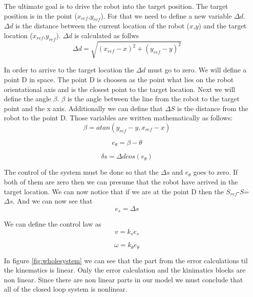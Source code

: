 The ultimate goal is to drive the robot into the target position. The target position is in the point ($x_{ref}$,$y_{ref}$). For that we need to define a new variable $\Delta d$. $\Delta d$ is the distance between the current location of the robot ($x$,$y$) and the target location ($x_{ref}$,$y_{ref}$). $\Delta d$ is calculated as follws
\begin{equation} \label{eq89}
\Delta d 
=\sqrt{(x_{ref}-x)^2+(y_{ref}-y)^2}
\end{equation}

In order to arrive to the target location the $\Delta d$ must go to zero. 
We will define a point D in space. The point D is choosen as the point what lies on the robot orientational axis and is the closest point to the target location. Next we will define the angle $\beta$.
$\beta$ is the angle between the line from the robot to the target point and the x axis. Additionally we can define that $\Delta S$ is the distance from the robot to the point D. Those variables are written mathematically as follows:
\begin{equation} \label{eq90}
\beta=atan(y_{ref}-y,x_{ref}-x)
\end{equation}

\begin{equation} \label{eq91}
e_{\theta}=\beta-\theta
\end{equation}

\begin{equation} \label{eq92}
\delta s= \Delta d cos(e_{\theta})
\end{equation}

The control of the system must be done so that the $\Delta s$ and $e_{\theta}$ goes to zero. If both of them are zero then we can presume that the robot have arrived in the target location.
We can now notice that if we are at the point D then the $S_{ref}$-$S$=$\Delta s$. And we can now see that
\begin{equation} \label{eq93}
e_{s}=\Delta s
\end{equation}

We can define the control law as
\begin{equation} \label{eq94}
v=k_{s}e_{s}
\end{equation}

\begin{equation} \label{eq95}
\omega=k_{\theta}e_{\theta}
\end{equation}

In figure \ref{fig:wholesystem} we can see that the part from the error calculations til the kinematics is  linear. Only the error calculation and the kinimatics blocks are non linear. Since there are non linear parts in our model we must conclude that all of the closed loop system is nonlinear.


